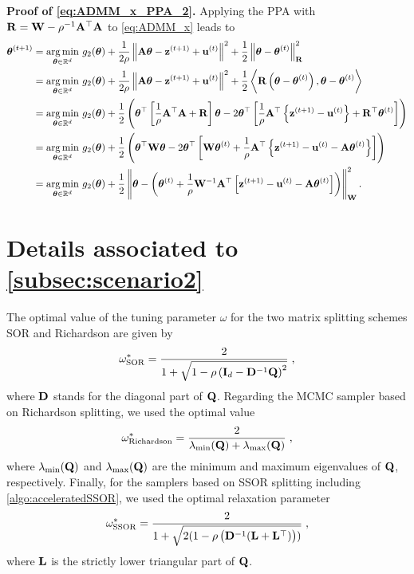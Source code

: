 \documentclass[nohypdvips,onefignum,onetabnum]{siamart171218}
\begin{document}
\noindent\textbf{Proof of \cref{eq:ADMM_x_PPA_2}.}
Applying the PPA with $\mathbf{R} = \mathbf{W} - \rho^{-1}\mathbf{A}^{\top}\mathbf{A}$ to \cref{eq:ADMM_x} leads to 
{\small
\begin{align*}
  \Bs{\theta}^{(t+1)} &= \underset{\Bs{\theta}\in\mathbb{R}^d}{\arg \min}\ g_2(\Bs{\theta}) + \dfrac{1}{2\rho}\nr{\B{A}\Bs{\theta} - \B{z}^{(t+1)} + \B{u}^{(t)}}^2 + \dfrac{1}{2}\nr{\Bs{\theta}-\Bs{\theta}^{(t)}}^2_{\B{R}} \\
  &= \underset{\Bs{\theta}\in\mathbb{R}^d}{\arg \min}\ g_2(\Bs{\theta}) + \dfrac{1}{2\rho}\nr{\B{A}\Bs{\theta} - \B{z}^{(t+1)} + \B{u}^{(t)}}^2 + \dfrac{1}{2}\left\langle \B{R} \pr{\Bs{\theta}-\Bs{\theta}^{(t)}}, \Bs{\theta}-\Bs{\theta}^{(t)}\right\rangle \\
  &= \underset{\Bs{\theta}\in\mathbb{R}^d}{\arg \min}\ g_2(\Bs{\theta}) + \dfrac{1}{2}\pr{\Bs{\theta}^{\top}\br{\dfrac{1}{\rho}\B{A}^{\top}\B{A} + \B{R}}\Bs{\theta} - 2\Bs{\theta}^{\top}\br{\dfrac{1}{\rho}\B{A}^{\top}\bbr{\B{z}^{(t+1)}-\B{u}^{(t)}} + \B{R}^{\top}\Bs{\theta}^{(t)}}} \\
  &= \underset{\Bs{\theta}\in\mathbb{R}^d}{\arg \min}\ g_2(\Bs{\theta}) + \dfrac{1}{2}\pr{\Bs{\theta}^{\top}\B{W}\Bs{\theta} - 2\Bs{\theta}^{\top}\br{\B{W}\Bs{\theta}^{(t)} + \dfrac{1}{\rho}\B{A}^{\top}\bbr{\B{z}^{(t+1)}-\B{u}^{(t)} - \B{A}\Bs{\theta}^{(t)}}}} \\
  &= \underset{\Bs{\theta}\in\mathbb{R}^d}{\arg \min}\ g_2(\Bs{\theta}) + \dfrac{1}{2}\nr{\Bs{\theta} - \pr{\Bs{\theta}^{(t)} + \dfrac{1}{\rho}\B{W}^{-1}\B{A}^{\top}\br{\B{z}^{(t+1)}-\B{u}^{(t)} - \B{A}\Bs{\theta}^{(t)}}}}^2_{\B{W}}.
\end{align*}
}

\section{Details associated to \cref{subsec:scenario2}}
\label{appendix:C}

The optimal value of the tuning parameter $\omega$ for the two matrix splitting schemes SOR and Richardson are given by 
\begin{equation}
  \omega_{\mathrm{SOR}}^* = \dfrac{2}{1 + \sqrt{1 - \rho\left(\mathbf{I}_d - \mathbf{D}^{-1}\mathbf{Q}\right)^2}}\;,
\end{equation}
where $\mathbf{D}$ stands for the diagonal part of $\mathbf{Q}$.
Regarding the MCMC sampler based on Richardson splitting, we used the optimal value
\begin{equation}
  \omega_{\mathrm{Richardson}}^* = \dfrac{2}{\lambda_{\mathrm{min}}(\mathbf{Q}) + \lambda_{\mathrm{max}}(\mathbf{Q})}\;,
\end{equation}
where $\lambda_{\mathrm{min}}(\mathbf{Q})$ and $\lambda_{\mathrm{max}}(\mathbf{Q})$ are the minimum and maximum eigenvalues of $\mathbf{Q}$, respectively.
Finally, for the samplers based on SSOR splitting including \cref{algo:acceleratedSSOR}, we used the optimal relaxation parameter
\begin{equation}
  \omega_{\mathrm{SSOR}}^* = \dfrac{2}{1 + \sqrt{2(1 - \rho\left(\mathbf{D}^{-1}(\mathbf{L}+\mathbf{L}^{\top})\right))}}\;,
\end{equation}
where $\mathbf{L}$ is the strictly lower triangular part of $\mathbf{Q}$.




\end{document}
